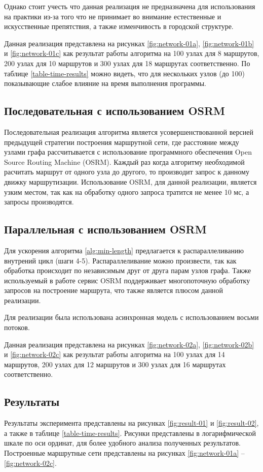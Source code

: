 Однако стоит учесть что данная реализация не предназначена для использования на практики из-за того что не 
принимает во внимание естественные и искусственные препятствия, а также изменчивость в городской структуре.

Данная реализация представлена на рисунках \ref{fig:network-01a}, \ref{fig:network-01b} и 
\ref{fig:network-01c} как результат работы алгоритма на 100 узлах для 8 маршрутов, 200 узлах для 10 маршрутов 
и 300 узлах для 18 маршрутах соответственно. По таблице \ref{table-time-results} можно видеть, что для нескольких 
узлов (до 100) показывающие слабое влияние на время выполнения программы.

\subsection{Последовательная с использованием OSRM}
Последовательная реализация алгоритма является усовершенствованной версией предыдущей стратегии построения 
маршрутной сети, где расстояние между узлами графа рассчитывается с использование программного обеспечения 
Open Source Routing Machine (OSRM). Каждый раз когда алгоритму необходимой расчитать маршрут от одного узла 
до другого, то производит запрос к данному движку маршрутизации. Использование OSRM, для данной реализации, 
является узким местом, так как на обработку одного запроса тратится не менее 10 мс, а запросы производятся.

\subsection{Параллельная с использованием OSRM}
Для ускорения алгоритма \ref{alg:min-length} предлагается к распараллеливанию внутрений цикл (шаги 4-5).
Распараллеливание можно произвести, так как обработка происходит по независимым друг от друга парам узлов 
графа. Также используемый в работе сервис OSRM поддерживает многопоточную обработку запросов на построение 
маршрута, что также является плюсом данной реализации. 

Для реализации была использована асинхронная модель с использованием восьми потоков.

Данная реализация представлена на рисунках \ref{fig:network-02a}, \ref{fig:network-02b} и 
\ref{fig:network-02c} как результат работы алгоритма на 100 узлах для 14 маршрутов, 200 узлах для 12 маршрутов 
и 300 узлах для 16 маршрутах соответственно.

\subsection{Результаты}
Результаты эксперимента представлены на рисунках \ref{fig:result-01} и \ref{fig:result-02}, а также в таблице 
\ref{table-time-results}. Рисунки представлены в логарифмической шкале по оси ординат, для более удобного анализа 
полученных результатов. Построенные маршрутные сети представлены на рисунках \ref{fig:network-01a} -- 
\ref{fig:network-02c}. 

